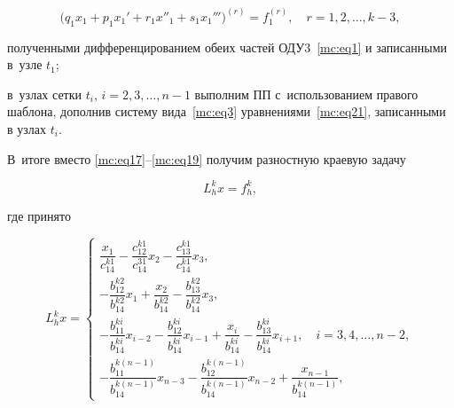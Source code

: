\begin{equation}

\label{mc:eq21}

  \bigl(q_1x_1+p_1x_1'+r_1x''_1+s_1x_1'''\bigr)^{(r)}=f_1^{(r)}, \quad 

  r=1,  2,  \dots,  k-3,

\end{equation}

полученными дифференцированием обеих частей ОДУ3~\eqref{mc:eq1} и записанными в~узле $    t_1$; 

в~узлах сетки $    t_i$, $  i=2,  3,  \dots,  n-1$ выполним ПП с~использованием правого шаблона, дополнив систему вида~\eqref{mc:eq3} уравнениями~\eqref{mc:eq21}, записанными в узлах $    t_i$. 

В~итоге вместо \eqref{mc:eq17}--\eqref{mc:eq19} получим разностную краевую задачу

\begin{equation}

\label{mc:eq22}

   L_{h}^kx=f_{h}^k,

\end{equation}

где принято

\begin{equation}

\label{mc:eq24}

   L_{h}^kx

=\begin{cases}

\dfrac{x_1}{c_{14}^{k1}}-

\dfrac{c_{12}^{k1}}{c_{14}^{31}} x_{2}-

\dfrac{c_{13}^{k1}}{c_{14}^{k1}} x_{3},

\\[3mm]

-\dfrac{b_{12}^{k2}}{b_{14}^{k2}} x_{1}+

\dfrac{x_2}{b_{14}^{k2}}-

\dfrac{b_{13}^{k2}}{b_{14}^{k2}} x_{3},

\\[3mm]

-\dfrac{b_{11}^{ki}}{b_{14}^{ki}} x_{i-2}-

\dfrac{b_{12}^{ki}}{b_{14}^{ki}} x_{i-1}+

\dfrac{x_i}{b_{14}^{ki}}-

\dfrac{b_{13}^{ki}}{b_{14}^{ki}} x_{i+1},\quad  i=3,  4,  \dots,  n-2,

\\[3mm]

-\dfrac{b_{11}^{k(n-1)}}{b_{14}^{k(n-1)}} x_{n-3}-

\dfrac{b_{12}^{k(n-1)}}{b_{14}^{k(n-1)}} x_{n-2}+

\dfrac{x_{n-1}}{b_{14}^{k(n-1)}},

\end{cases}

\end{equation}

